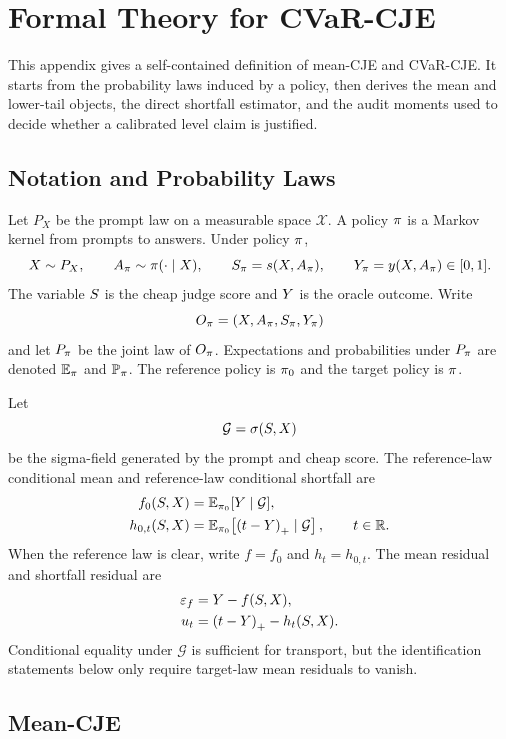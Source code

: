 \section{Formal Theory for CVaR-CJE}
\label{app:formal}
\label{app:proofs}

This appendix gives a self-contained definition of mean-CJE and CVaR-CJE.
It starts from the probability laws induced by a policy, then derives the
mean and lower-tail objects, the direct shortfall estimator, and the audit
moments used to decide whether a calibrated level claim is justified.

\subsection{Notation and Probability Laws}

Let $P_X$ be the prompt law on a measurable space $\mathcal{X}$. A policy
$\pi$ is a Markov kernel from prompts to answers. Under policy $\pi$,
\[
X\sim P_X,\qquad
A_\pi\sim \pi(\cdot\mid X),\qquad
S_\pi=s(X,A_\pi),\qquad
Y_\pi=y(X,A_\pi)\in[0,1].
\]
The variable $S$ is the cheap judge score and $Y$ is the oracle outcome.
Write
\[
O_\pi=(X,A_\pi,S_\pi,Y_\pi)
\]
and let $P_\pi$ be the joint law of $O_\pi$. Expectations and
probabilities under $P_\pi$ are denoted $\mathbb{E}_\pi$ and $\mathbb{P}_\pi$.
The reference policy is $\pi_{0}$ and the target policy is $\pi$.

Let
\[
\mathcal{G}=\sigma(S,X)
\]
be the sigma-field generated by the prompt and cheap score. The reference-law
conditional mean and reference-law conditional shortfall are
\begin{align}
f_0(S,X)
&=\mathbb{E}_{\pi_{0}}[Y\mid \mathcal{G}],\\
h_{0,t}(S,X)
&=\mathbb{E}_{\pi_{0}}\!\left[\left(t-Y\right)_{+}\mid \mathcal{G}\right],
\qquad t\in\mathbb{R}.
\end{align}
When the reference law is clear, write $f=f_0$ and $h_t=h_{0,t}$. The mean
residual and shortfall residual are
\begin{align}
\varepsilon_f
&=Y-f(S,X),\\
u_t
&=\left(t-Y\right)_{+}-h_t(S,X).
\end{align}
Conditional equality under $\mathcal{G}$ is sufficient for transport, but the
identification statements below only require target-law mean residuals to
vanish.

\subsection{Mean-CJE}

